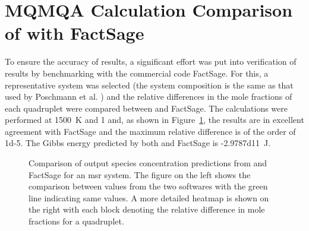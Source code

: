 \section{MQMQA Calculation Comparison of {\GEM} with FactSage}
To ensure the accuracy of results, a significant effort was put into verification of {\GEM} results by benchmarking with the commercial code FactSage. For this, a representative system was selected (the system composition is the same as that used by Poschmann et al. \cite{Poschmann:2021ab}) and the relative differences in the mole fractions of each quadruplet were compared between {\GEM} and FactSage. The calculations were performed at \SI{1500}{\kelvin} and \SI{1}{\atmosphere} and, as shown in Figure~\ref{fig:verif}, the results are in excellent agreement with FactSage and the maximum relative difference is of the order of \num{1d-5}. The Gibbs energy predicted by both {\GEM} and FactSage is \SI{-2.9787d11}{\joule}. 
\begin{figure}[!ht]
    \hfill
    \caption[Comparison of output species concentration predictions from {\GEM} and FactSage for an MSR system.]{Comparison of output species concentration predictions from {\GEM} and FactSage for an \gls{msr} system. The figure on the left shows the comparison between values from the two softwares with the green line indicating same values. A more detailed heatmap is shown on the right with each block denoting the relative difference in mole fractions for a quadruplet.}
    \label{fig:verif}
\end{figure}
       
